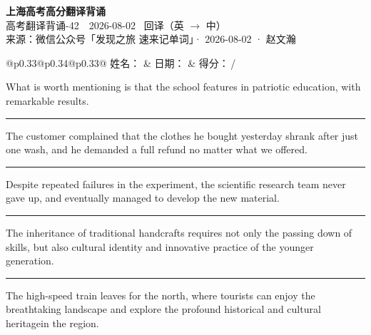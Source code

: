 \documentclass[11pt,a4paper]{article}
\newcommand{\num}[1]{\makebox[1.9em][r]{#1.}\hspace{0.3em}}
\newcommand{\wline}{\noindent\rule{\linewidth}{0.4pt}}
\begin{document}
\pagestyle{plain}
\begin{center}
{\LARGE\bfseries 上海高考高分翻译背诵 }\\[0.25em]
{\large 高考翻译背诵-42　2026-08-02 \quad\ 回译（英 $\to$ 中）}\\[0.35em]
{\footnotesize 来源：微信公众号「发现之旅 速来记单词」· 2026-08-02 · 赵文瀚}
\end{center}

\vspace{0.4em}
\noindent\begin{tabular}{@{}p{0.33\textwidth}@{}p{0.34\textwidth}@{}p{0.33\textwidth}@{}}
姓名：\underline{\hspace{2.0cm}} & 日期：\underline{\hspace{2.0cm}} & 得分：\underline{\hspace{1.4cm}}\,/ \\
\end{tabular}

\vspace{0.5em}

\vspace{0.8em}
\num{1}What is worth mentioning is that the school features in patriotic education, with remarkable results.

\vspace{0.25em}

\wline

\num{2}The customer complained that the clothes he bought yesterday shrank after just one wash, and he demanded a full refund no matter what we offered.

\vspace{0.25em}

\wline

\num{3}Despite repeated failures in the experiment, the scientific research team never gave up, and eventually managed to develop the new material.

\vspace{0.25em}

\wline

\num{4}The inheritance of traditional handcrafts requires not only the passing down of skills, but also cultural identity and innovative practice of the younger generation.

\vspace{0.25em}

\wline

\num{5}The high-speed train leaves for the north, where tourists can enjoy the breathtaking landscape and explore the profound historical and cultural heritagein the region.
\end{document}
